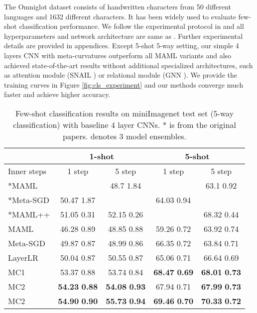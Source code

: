 \documentclass{article}
\begin{document}
The Omniglot dataset consists of handwritten characters from 50 different languages and 1632 different characters. It has been widely used to evaluate few-shot classification performance. We follow the experimental protocol in \cite{Finn-icml-2017} and all hyperparameters and network architecture are same as \cite{Finn-icml-2017}. Further experimental details are provided in appendices. Except 5-shot 5-way setting, our simple 4 layers CNN with meta-curvatures outperform all MAML variants and also achieved state-of-the-art results without additional specialized architectures, such as attention module (SNAIL \cite{snail}) or relational module (GNN \cite{gnn}). We provide the training curves in Figure \ref{fig:cls_experiment} and our methods converge much faster and achieve higher accuracy.

\begin{table}[t]
\caption{Few-shot classification results on miniImagenet test set (5-way classification) with baseline 4 layer CNNs. \mbox{*} is from the original papers.  denotes 3 model ensembles.}
\vskip -0.1in
\label{table:miniimagenet}
\begin{center}
\begin{small}
\begin{tabular}{lcccc}
\toprule
& \multicolumn{2}{c}{1-shot} & \multicolumn{2}{c}{5-shot} \\
\midrule
Inner steps & 1 step & 5 step & 1 step & 5 step \\
\midrule
\mbox{*}MAML               &   & 48.7  1.84    &    & 63.1  0.92\\
\mbox{*}Meta-SGD           & 50.47  1.87   &            & 64.03  0.94 &   \\
\mbox{*}MAML++  & 51.05  0.31   & 52.15  0.26   &            & 68.32  0.44 \\
\midrule
MAML       & 46.28  0.89   & 48.85  0.88    & 59.26  0.72  & 63.92  0.74 \\
Meta-SGD   & 49.87  0.87   & 48.99  0.86    & 66.35  0.72  & 63.84  0.71 \\
LayerLR            & 50.04  0.87   & 50.55  0.87    & 65.06  0.71  & 66.64  0.69 \\
MC1                & 53.37  0.88   & 53.74  0.84    & \textbf{68.47}  \textbf{0.69} & \textbf{68.01}  \textbf{0.73} \\
MC2                & \textbf{54.23}  \textbf{0.88}   & \textbf{54.08}  \textbf{0.93} & 67.94  0.71  & \textbf{67.99}  \textbf{0.73} \\
MC2     & \textbf{54.90}  \textbf{0.90}   & \textbf{55.73}  \textbf{0.94} & \textbf{69.46}  \textbf{0.70}  & \textbf{70.33}  \textbf{0.72} \\
\bottomrule
\end{tabular}
\end{small}
\end{center}
\vskip -0.1in
\end{table}
\end{document}
